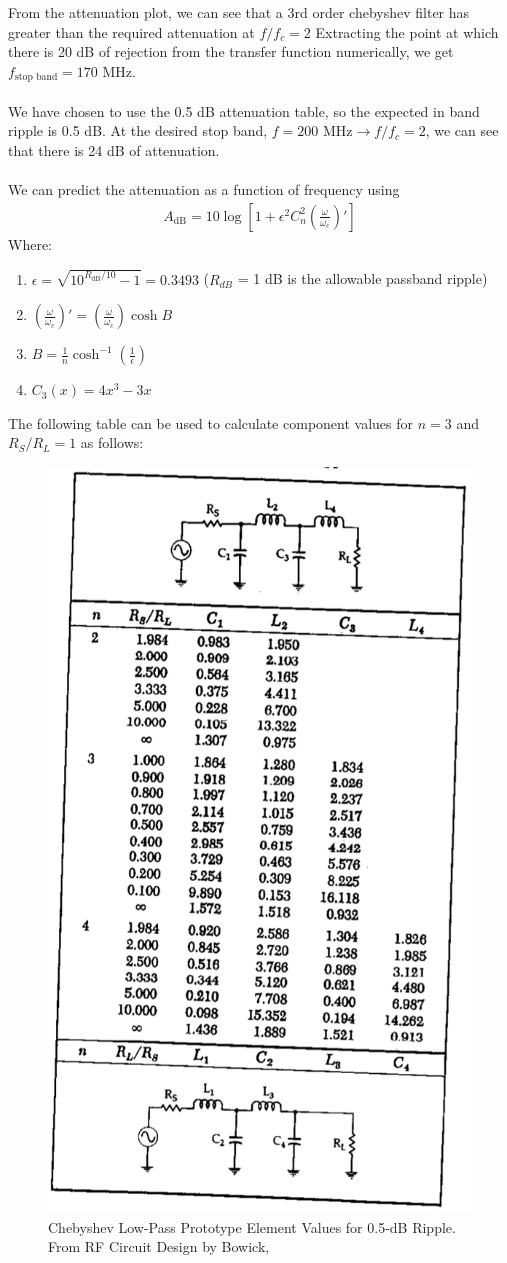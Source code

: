\documentclass[letterpaper,12pt]{article}
\begin{document}
\noindent
From the attenuation plot, we can see that a 3rd order chebyshev filter has greater than the required attenuation at $f/f_c=2$
Extracting the point at which there is 20 dB of rejection from the transfer function numerically, we get $f_\text{stop band}=170 \text{ MHz}$. \\
\\
We have chosen to use the 0.5 dB attenuation table, so the expected in band ripple is 0.5 dB.
At the desired stop band, $f = 200 \text{ MHz} \to f/f_c=2$, we can see that there is 24 dB of attenuation.\\
\\
We can predict the attenuation as a function of frequency using
\begin{align*}
    A_\text{dB}=10\log\left[1+\epsilon^2C_n^2\left(\frac{\omega}{\omega_c}\right)'\right]
\end{align*}
Where:
\begin{enumerate}
  \item $\epsilon=\sqrt{10^{R_\text{dB}/10}-1} = 0.3493$ ($R_{dB}$ = 1 dB is the allowable passband ripple)
  \item $\left(\frac{\omega}{\omega_c}\right)' = \left(\frac{\omega}{\omega_c}\right) \cosh B$
  \item $B=\frac{1}{n}\cosh^{-1}\left(\frac{1}{\epsilon}\right)$
  \item $C_3(x)=4x^3-3x$
\end{enumerate}
The following table can be used to calculate component values for $n=3$ and $R_S/R_L = 1$ as follows:
\begin{figure}[H] 
    \centering \includegraphics[width=0.3\columnwidth]{figures/3.filter_table}
    \caption{
            \label{fig:2.filter_table}
            Chebyshev Low-Pass Prototype Element Values for 0.5-dB Ripple.  From RF Circuit Design by Bowick, \cite{Bowick2007-br}
    }
\end{figure}
\end{document}
